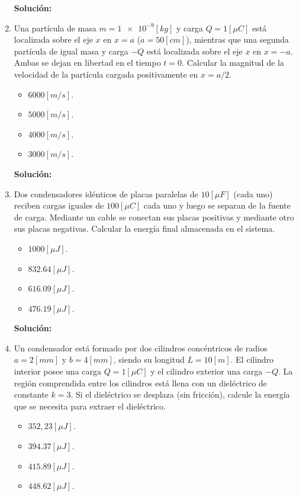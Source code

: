 \documentclass[letter,11pt]{article}
\begin{document}
\begin{enumerate}
\textbf{Solución:}

\item Una partícula de masa $m = \num{1e-9} [kg]$ y carga $Q = 1 [\mu C]$ está
localizada sobre el eje $x$ en $x = a$ ($a = 50 [cm]$), mientras que una segunda
partícula de igual masa y carga $-Q$ está localizada sobre el eje $x$ en
$x = -a$. Ambas se dejan en libertad en el tiempo $t = 0$. Calcular la magnitud
de la velocidad de la partícula cargada positivamente en $x = a/2$.

\begin{itemize}
    \item $6000 [m/s]$.
    \item $5000 [m/s]$.
    \item $4000 [m/s]$.
    \item $3000 [m/s]$.
\end{itemize}

\textbf{Solución:}

\item Dos condensadores idénticos de placas paralelas de $10 [\mu F]$ (cada uno)
reciben cargas iguales de $100 [\mu C]$ cada uno y luego se separan de la fuente
de carga. Mediante un cable se conectan sus placas positivas y mediante otro sus
placas negativas. Calcular la energía final almacenada en el sistema.

\begin{itemize}
    \item $1000    [\mu J]$.
    \item $ 832.64 [\mu J]$.
    \item $ 616.09 [\mu J]$.
    \item $ 476.19 [\mu J]$.
\end{itemize}

\textbf{Solución:}

\item Un condensador está formado por dos cilindros concéntricos de radios
$a = 2 [mm]$ y $b = 4 [mm]$, siendo su longitud $L = 10 [m]$. El cilindro
interior posee una carga $Q =1 [\mu C]$ y el cilindro exterior una carga $-Q$.
La región comprendida entre los cilindros está llena con un dieléctrico de
constante $k = 3$. Si el dieléctrico se desplaza (sin fricción), calcule la
energía que se necesita para extraer el dieléctrico.

\begin{itemize}
    \item $352,23 [\mu J]$.
    \item $394.37 [\mu J]$.
    \item $415.89 [\mu J]$.
    \item $448.62 [\mu J]$.
\end{itemize}


\end{enumerate}
\end{document}
